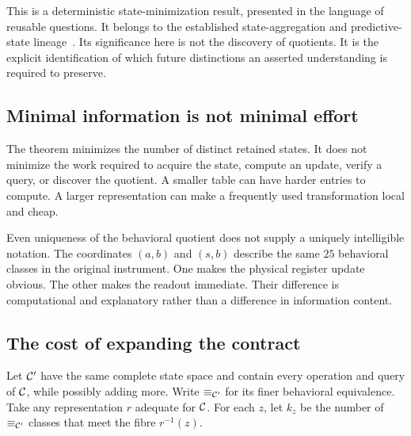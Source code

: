 \documentclass[11pt,letterpaper]{article}
\theoremstyle{plain}
\theoremstyle{definition}
\begin{document}
This is a deterministic state-minimization result, presented in the language of reusable questions. It belongs to the established state-aggregation and predictive-state lineage~\cite{givan,shalizi}. Its significance here is not the discovery of quotients. It is the explicit identification of which future distinctions an asserted understanding is required to preserve.

\subsection{Minimal information is not minimal effort}
The theorem minimizes the number of distinct retained states. It does not minimize the work required to acquire the state, compute an update, verify a query, or discover the quotient. A smaller table can have harder entries to compute. A larger representation can make a frequently used transformation local and cheap.

Even uniqueness of the behavioral quotient does not supply a uniquely intelligible notation. The coordinates $(a,b)$ and $(s,b)$ describe the same $25$ behavioral classes in the original instrument. One makes the physical register update obvious. The other makes the readout immediate. Their difference is computational and explanatory rather than a difference in information content.

\subsection{The cost of expanding the contract}
Let $\mathcal C'$ have the same complete state space and contain every operation and query of $\mathcal C$, while possibly adding more. Write $\equiv_{\mathcal C'}$ for its finer behavioral equivalence. Take any representation $r$ adequate for $\mathcal C$. For each $z$, let $k_z$ be the number of $\equiv_{\mathcal C'}$ classes that meet the fibre $r^{-1}(z)$.
\end{document}
